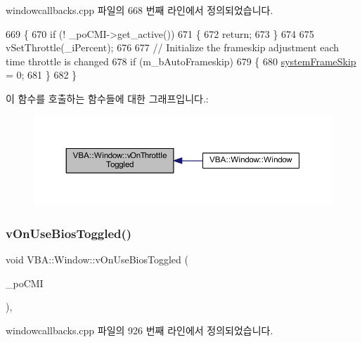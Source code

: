 windowcallbacks.\+cpp 파일의 668 번째 라인에서 정의되었습니다.


\begin{DoxyCode}
669 \{
670   \textcolor{keywordflow}{if} (! \_poCMI->get\_active())
671   \{
672     \textcolor{keywordflow}{return};
673   \}
674 
675   vSetThrottle(\_iPercent);
676 
677   \textcolor{comment}{// Initialize the frameskip adjustment each time throttle is changed}
678   \textcolor{keywordflow}{if} (m\_bAutoFrameskip)
679   \{
680     \mbox{\hyperlink{system_8cpp_ac88aa402d015fda6917b150c22a28968}{systemFrameSkip}} = 0;
681   \}
682 \}
\end{DoxyCode}
이 함수를 호출하는 함수들에 대한 그래프입니다.\+:
\nopagebreak
\begin{figure}[H]
\begin{center}
\leavevmode
\includegraphics[width=350pt]{class_v_b_a_1_1_window_a86f6a68bfbf9928605aa80a543d49038_icgraph}
\end{center}
\end{figure}
\mbox{\label{class_v_b_a_1_1_window_a4c3cba9990c0f7315b49d2c8d338280b}} 
\subsubsection{\texorpdfstring{v\+On\+Use\+Bios\+Toggled()}{vOnUseBiosToggled()}}
{\footnotesize\ttfamily void V\+B\+A\+::\+Window\+::v\+On\+Use\+Bios\+Toggled (\begin{DoxyParamCaption}\item[{Gtk\+::\+Check\+Menu\+Item $\ast$}]{\+\_\+po\+C\+MI }\end{DoxyParamCaption})\hspace{0.3cm}{\ttfamily [protected]}, {\ttfamily [virtual]}}



windowcallbacks.\+cpp 파일의 926 번째 라인에서 정의되었습니다.


